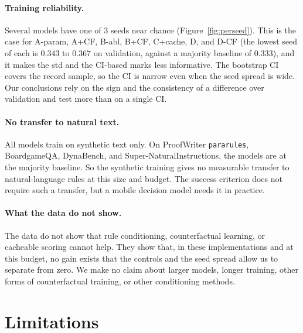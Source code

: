 \documentclass[11pt,a4paper]{article}
\begin{document}
\paragraph{Training reliability.}
Several models have one of 3 seeds near chance (Figure~\ref{fig:perseed}).
This is the case for A-param, A+CF, B-abl, B+CF, C+cache, D, and D-CF (the lowest seed of each is $0.343$ to $0.367$ on validation, against a majority baseline of $0.333$), and it makes the std and the CI-based marks less informative.
The bootstrap CI covers the record sample, so the CI is narrow even when the seed spread is wide.
Our conclusions rely on the sign and the consistency of a difference over validation and test more than on a single CI.

\paragraph{No transfer to natural text.}
All models train on synthetic text only.
On ProofWriter \texttt{pararules}, BoardgameQA, DynaBench, and Super-NaturalInstructions, the models are at the majority baseline.
So the synthetic training gives no measurable transfer to natural-language rules at this size and budget.
The success criterion does not require such a transfer, but a mobile decision model needs it in practice.

\paragraph{What the data do not show.}
The data do not show that rule conditioning, counterfactual learning, or cacheable scoring cannot help.
They show that, in these implementations and at this budget, no gain exists that the controls and the seed spread allow us to separate from zero.
We make no claim about larger models, longer training, other forms of counterfactual training, or other conditioning methods.

\section{Limitations}\label{sec:limits}
\end{document}
